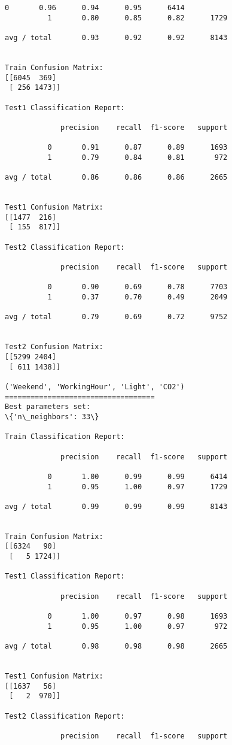 \documentclass[11pt]{article}
\begin{document}
\begin{Verbatim}[commandchars=\\\{\}]
          0       0.96      0.94      0.95      6414
          1       0.80      0.85      0.82      1729

avg / total       0.93      0.92      0.92      8143


Train Confusion Matrix:
[[6045  369]
 [ 256 1473]]

Test1 Classification Report:

             precision    recall  f1-score   support

          0       0.91      0.87      0.89      1693
          1       0.79      0.84      0.81       972

avg / total       0.86      0.86      0.86      2665


Test1 Confusion Matrix:
[[1477  216]
 [ 155  817]]

Test2 Classification Report:

             precision    recall  f1-score   support

          0       0.90      0.69      0.78      7703
          1       0.37      0.70      0.49      2049

avg / total       0.79      0.69      0.72      9752


Test2 Confusion Matrix:
[[5299 2404]
 [ 611 1438]]

('Weekend', 'WorkingHour', 'Light', 'CO2')
===================================
Best parameters set:
\{'n\_neighbors': 33\}

Train Classification Report:

             precision    recall  f1-score   support

          0       1.00      0.99      0.99      6414
          1       0.95      1.00      0.97      1729

avg / total       0.99      0.99      0.99      8143


Train Confusion Matrix:
[[6324   90]
 [   5 1724]]

Test1 Classification Report:

             precision    recall  f1-score   support

          0       1.00      0.97      0.98      1693
          1       0.95      1.00      0.97       972

avg / total       0.98      0.98      0.98      2665


Test1 Confusion Matrix:
[[1637   56]
 [   2  970]]

Test2 Classification Report:

             precision    recall  f1-score   support


\end{Verbatim}
\end{document}

